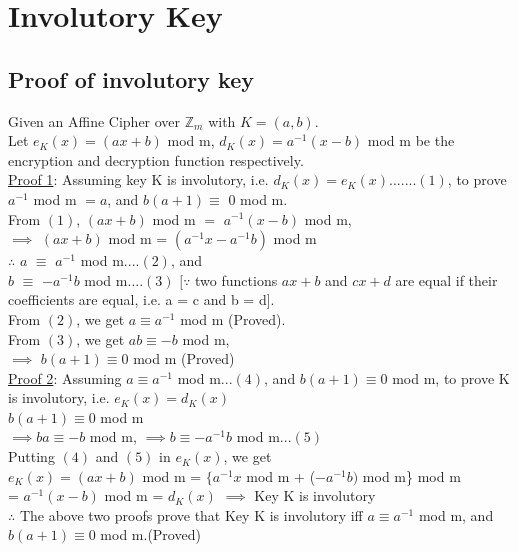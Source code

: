 \documentclass[12pt]{article}
\begin{document}
\section{Involutory Key}
\begin{large}
\subsection{Proof of involutory key}
Given an Affine Cipher over $\mathbb{Z}_{m}$ with $K = (a,b)$.\\
Let $e_{K}(x) = (ax + b)$ mod m, $d_{K}(x) = a^{-1}(x - b)$ mod m be the encryption and decryption function respectively.\\
\underline{Proof 1}: Assuming key K is involutory, i.e. $d_{K}(x) = e_{K}(x).......(1)$, to prove\\ $a^{-1}$ mod m $ = a$, and $b(a + 1) \equiv$ $0$ mod m.\\
From $(1)$, $(ax + b)$ mod m $=$ $a^{-1}(x - b)$ mod m,\\
$\implies$ $(ax + b)$ mod m = $(a^{-1}x - a^{-1}b)$ mod m\\
$\therefore$ $a$ $\equiv$ $a^{-1}$ mod m$....(2)$, and\\ $b$ $\equiv$ $-a^{-1}b$ mod m$....(3)$ $[\because$ two functions $ax + b$ and $cx + d$ are equal if their coefficients are equal, i.e. a = c and b = d].\\
From $(2)$, we get $a \equiv a^{-1}$ mod m (Proved).\\
From $(3)$, we get $ab \equiv -b$ mod m,\\
$\implies$ $b(a + 1) \equiv 0$ mod m (Proved)\\
\underline{Proof 2}: Assuming $a \equiv a^{-1}$ mod m$...(4)$, and $b(a+1) \equiv 0$ mod m, to prove K is involutory, i.e. $e_{K}(x) = d_{K}(x)$\\
$b(a + 1) \equiv 0$ mod m\\
$\implies ba \equiv -b$ mod m, $\implies b \equiv -a^{-1}b$ mod m$...(5)$\\
Putting $(4)$ and $(5)$ in $e_{K}(x)$, we get\\
$e_{K}(x) = (ax + b)$ mod m = $\{a^{-1}x$ mod m  + ($-a^{-1}b)$ mod m\} mod m\\
= $a^{-1}(x - b)$ mod m = $d_{K}(x)$ $\implies$ Key K is involutory\\
$\therefore$ The above two proofs prove that Key K is involutory iff $a \equiv a^{-1}$ mod m, and $b(a + 1) \equiv 0$ mod m.(Proved)

\end{large}
\end{document}
